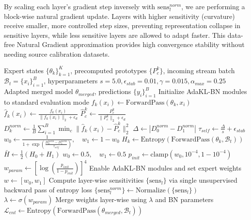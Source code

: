 \documentclass{article}
\begin{document}
By scaling each layer's gradient step inversely with $\text{sens}_l^{norm}$, we are performing a block-wise natural gradient update. Layers with higher sensitivity (curvature) receive smaller, more controlled step sizes, preventing representation collapse in sensitive layers, while less sensitive layers are allowed to adapt faster. This data-free Natural Gradient approximation provides high convergence stability without needing source calibration datasets.

\begin{algorithm}[tb]
\caption{AdaKL-BN: Test-Time Model Merging}
\label{alg:adakl_bn}
\begin{algorithmic}[1]
 Expert states $\{\theta_k\}_{k=1}^K$, precomputed prototypes $\{P^k_{c}\}$, incoming stream batch $\mathcal{B}_t = \{x_i\}_{i=1}^B$, hyperparameters $s=5.0, \epsilon_{stab}=0.01, \gamma=0.015, \alpha_{max}=0.25$
 Adapted merged model $\theta_{merged}$, predictions $\{y_i\}_{i=1}^B$
\STATE Initialize AdaKL-BN modules to standard evaluation mode
    \STATE $f_k(x_i) \leftarrow \text{ForwardPass}(\theta_k, x_i)$
    \STATE $\hat{f}_k(x_i) \leftarrow \frac{f_k(x_i)}{\|f_k(x_i)\|_2 + \epsilon_d}$
    \STATE $\hat{P}_{c}^k \leftarrow \frac{P_{c}^k}{\|P_{c}^k\|_2 + \epsilon_d}$
    \STATE $D_k^{norm} \leftarrow \frac{1}{B} \sum_{i=1}^B \min_{c} \|\hat{f}_k(x_i) - \hat{P}_{c}^k\|_2^2$
\ENDFOR
\STATE $\Delta \leftarrow |D_0^{norm} - D_1^{norm}|$
\STATE $\tau_{self} \leftarrow \frac{\Delta}{s} + \epsilon_{stab}$
\STATE $w_0 \leftarrow \frac{1}{1 + \exp\left(\frac{D_0^{norm} - D_1^{norm}}{\tau_{self}}\right)}, \quad w_1 \leftarrow 1 - w_0$
\STATE $H_k \leftarrow \text{Entropy}(\text{ForwardPass}(\theta_k, \mathcal{B}_t))$
\STATE $\bar{H} \leftarrow \frac{1}{2}(H_0 + H_1)$
    \STATE $w_0 \leftarrow 0.5, \quad w_1 \leftarrow 0.5$ 
\ENDIF
\STATE $p_{init} \leftarrow \text{clamp}(w_0, 10^{-4}, 1 - 10^{-4})$
\STATE $w_{param} \leftarrow \left[\log\left(\frac{p_{init}}{1 - p_{init}}\right)\right]^4$
\STATE Enable AdaKL-BN modules and set expert weights $w \leftarrow [w_0, w_1]$
\STATE Compute layer-wise sensitivities $\{\text{sens}_l\}$ via single unsupervised backward pass of entropy loss
\STATE $\{\text{sens}_l^{norm}\} \leftarrow \text{Normalize}(\{\text{sens}_l\})$
    \STATE $\lambda \leftarrow \sigma(w_{param})$
    \STATE Merge weights layer-wise using $\lambda$ and BN parameters
    \STATE $\mathcal{L}_{ent} \leftarrow \text{Entropy}(\text{ForwardPass}(\theta_{merged}, \mathcal{B}_t))$

\end{algorithmic}
\end{algorithm}
\end{document}

